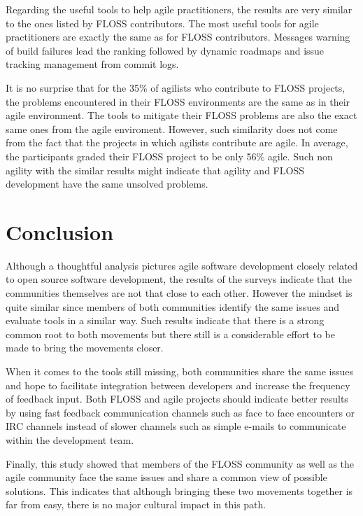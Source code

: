 \documentclass[lnbip]{svmultln}
\begin{document}
Regarding the useful tools to help agile practitioners, the results
are very similar to the ones listed by FLOSS contributors. The most
useful tools for agile practitioners are exactly the same as for FLOSS
contributors. Messages warning of build failures lead the ranking
followed by dynamic roadmaps and issue tracking management from commit
logs.

It is no surprise that for the 35\% of agilists who contribute to
FLOSS projects, the problems encountered in their FLOSS environments
are the same as in their agile environment. The tools to mitigate
their FLOSS problems are also the exact same ones from the agile
enviroment. However, such similarity does not come from the fact that
the projects in which agilists contribute are agile. In average, the
participants graded their FLOSS project to be only 56\% agile. Such
non agility with the similar results might indicate that agility and
FLOSS development have the same unsolved problems.

\section{Conclusion}
\label{sec:conclusion}

Although a thoughtful analysis pictures agile software development
closely related to open source software development, the results of
the surveys indicate that the communities themselves are not that
close to each other. However the mindset is quite similar since
members of both communities identify the same issues and evaluate
tools in a similar way. Such results indicate that there is a strong
common root to both movements but there still is a considerable effort
to be made to bring the movements closer.

When it comes to the tools still missing, both communities share the
same issues and hope to facilitate integration between developers and
increase the frequency of feedback input. Both FLOSS and agile
projects should indicate better results by using fast feedback
communication channels such as face to face encounters or IRC channels
instead of slower channels such as simple e-mails to communicate
within the development team.

Finally, this study showed that members of the FLOSS community as well
as the agile community face the same issues and share a common view of
possible solutions. This indicates that although bringing these two
movements together is far from easy, there is no major cultural impact
in this path.
\end{document}
